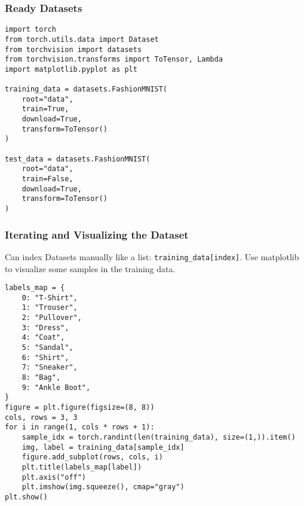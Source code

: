 \begin{frame}[fragile]
\frametitle{Ready Datasets}

\begin{lstlisting}
import torch
from torch.utils.data import Dataset
from torchvision import datasets
from torchvision.transforms import ToTensor, Lambda
import matplotlib.pyplot as plt

training_data = datasets.FashionMNIST(
    root="data",
    train=True,
    download=True,
    transform=ToTensor()
)

test_data = datasets.FashionMNIST(
    root="data",
    train=False,
    download=True,
    transform=ToTensor()
)
\end{lstlisting}

\end{frame} 

\begin{frame}[fragile]
\frametitle{Iterating and Visualizing the Dataset}

Can index Datasets manually like a list: \lstinline|training_data[index]|.
Use matplotlib to visualize some samples in the training data.

\begin{lstlisting}
labels_map = {
    0: "T-Shirt",
    1: "Trouser",
    2: "Pullover",
    3: "Dress",
    4: "Coat",
    5: "Sandal",
    6: "Shirt",
    7: "Sneaker",
    8: "Bag",
    9: "Ankle Boot",
}
figure = plt.figure(figsize=(8, 8))
cols, rows = 3, 3
for i in range(1, cols * rows + 1):
    sample_idx = torch.randint(len(training_data), size=(1,)).item()
    img, label = training_data[sample_idx]
    figure.add_subplot(rows, cols, i)
    plt.title(labels_map[label])
    plt.axis("off")
    plt.imshow(img.squeeze(), cmap="gray")
plt.show()
\end{lstlisting}

\end{frame} 

